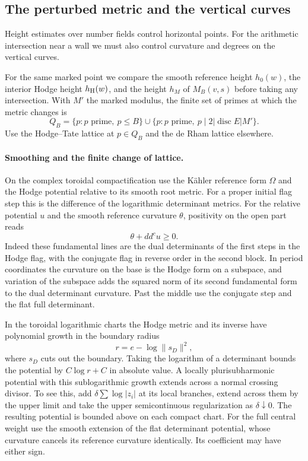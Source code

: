 \subsection{The perturbed metric and the vertical curves}
\label{subsec:flag-wall-positivity}

Height estimates over number fields control horizontal points. For the arithmetic intersection near a wall we must also control curvature and degrees on the vertical curves.

For the same marked point we compare the smooth reference
height \(h_0(w)\), the interior Hodge height \(h_{\rm H}(w)\), and
the height \(h_M\) of \(M_B(v,s)\) before taking any
intersection. With \(M'\) the marked modulus, the finite set of primes at which the metric changes is
\[
 Q_B=\{p:p\text{ prime},\ p\le B\}
      \mathbin{\cup}\{p:p\text{ prime},\ p\mid 2|\operatorname{disc}E|M'\}.
\] Use the Hodge--Tate lattice at \(p\in Q_B\)
and the de Rham lattice elsewhere.

\paragraph{Smoothing and the finite change of lattice.}
On the complex toroidal compactification use the Kähler reference
form \(\Omega\) and the Hodge potential relative to its smooth
root metric. For a proper initial flag step this is the difference
of the logarithmic determinant metrics. For the relative potential \(u\) and the smooth reference curvature \(\theta\), positivity on the open part reads
\[
 \theta+dd^c u\ge0.
\]
Indeed these fundamental lines are the dual determinants of the first
steps in the Hodge flag, with the conjugate flag in reverse order in
the second block. In period coordinates the curvature on the base
is the Hodge form on a subspace, and variation of the subspace adds
the squared norm of its second fundamental form to the dual
determinant curvature. Past the middle use the conjugate step and
the flat full determinant.

In the toroidal logarithmic charts the
Hodge metric and its inverse have polynomial growth in the boundary
radius
\[
 r=e-\log\|s_D\|^2,
\]
where \(s_D\) cuts out the boundary.
Taking the logarithm of a determinant bounds the potential by
\(C\log r+C\) in absolute value. A locally plurisubharmonic
potential with this sublogarithmic growth extends across a normal
crossing divisor. To see this, add \(\delta\sum\log|z_i|\) at its local branches,
extend across them by the upper limit and take the upper
semicontinuous regularization as \(\delta\downarrow0\).
The resulting potential is bounded above on each compact chart.
For the full central weight use the smooth extension of the
flat determinant potential, whose curvature cancels its reference
curvature identically. Its coefficient may have either sign.
\label{cor:flag-wall-positivity-1}

